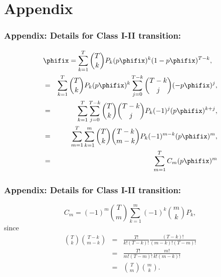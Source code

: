 \section{Appendix}

\begin{frame}
  \frametitle{Appendix: Details for Class I-II transition:}

  \begin{eqnarray*}
    \label{gcontlong.eq:transIcalc1}
    \lefteqn{\phifix 
      = 
      \sum_{k=1}^{T}
      \binom{T}{k}
      P_k
      (p\phifix)^{k}
      (1-p\phifix)^{T-k},
    }
    \nonumber \\
      & = & 
      \sum_{k=1}^{T}
      \binom{T}{k}
      P_k
      (p\phifix)^{k}
      \sum_{j=0}^{T-k}
      \binom{T-k}{j}
      (-p\phifix)^{j},
      \nonumber \\
      & = & 
      \sum_{k=1}^{T}
      \sum_{j=0}^{T-k}
      \binom{T}{k}
      \binom{T-k}{j}
      P_k
      (-1)^{j}(p\phifix)^{k+j},
      \nonumber \\
      & = &
      \sum_{m=1}^{T}
      \sum_{k=1}^{m}
      \binom{T}{k}
      \binom{T-k}{m-k}
      P_k
      (-1)^{m-k}
      (p\phifix)^{m},
      \nonumber \\
      & = & 
      \sum_{m=1}^{T}
      C_m
      (p\phifix)^{m}
      \nonumber \\
  \end{eqnarray*}

\end{frame}


\begin{frame}
  \frametitle{Appendix: Details for Class I-II transition:}

  $$
  C_m = 
  (-1)^{m}
  \binom{T}{m}
  \sum_{k=1}^{m}
  (-1)^{k}
  \binom{m}{k}
  P_k,
  $$
  since 
  \begin{eqnarray*}
    \label{gcontlong.eq:ckcalc}  
    \binom{T}{k} \binom{T-k}{m-k}
    & = &
    \frac{T!}{k!(T-k)!}
    \frac{(T-k)!}{(m-k)!(T-m)!}
    \nonumber  \\
    & = & 
    \frac{T!}{m!(T-m)!}
    \frac{m!}{k!(m-k)!}
    \nonumber \\
    & = &
    \binom{T}{m} \binom{m}{k}.
  \end{eqnarray*}

\end{frame}

